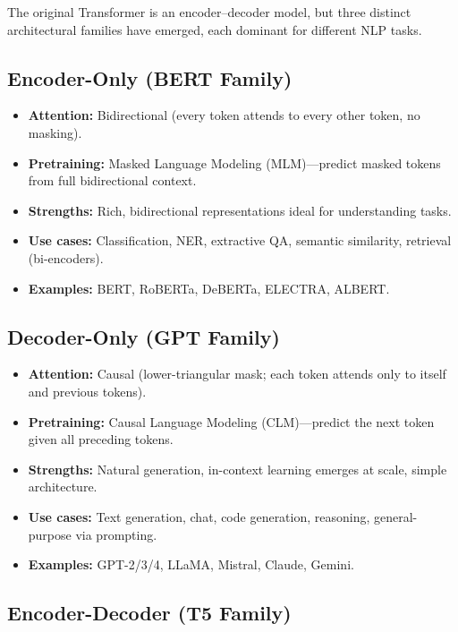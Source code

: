 The original Transformer is an encoder--decoder model, but three distinct
architectural families have emerged, each dominant for different NLP tasks.

\subsection{Encoder-Only (BERT Family)}

\begin{itemize}
    \item \textbf{Attention:} Bidirectional (every token attends to every other
          token, no masking).
    \item \textbf{Pretraining:} Masked Language Modeling (MLM)---predict masked
          tokens from full bidirectional context.
    \item \textbf{Strengths:} Rich, bidirectional representations ideal for
          understanding tasks.
    \item \textbf{Use cases:} Classification, NER, extractive QA, semantic
          similarity, retrieval (bi-encoders).
    \item \textbf{Examples:} BERT, RoBERTa, DeBERTa, ELECTRA, ALBERT.
\end{itemize}

\subsection{Decoder-Only (GPT Family)}

\begin{itemize}
    \item \textbf{Attention:} Causal (lower-triangular mask; each token attends
          only to itself and previous tokens).
    \item \textbf{Pretraining:} Causal Language Modeling (CLM)---predict the
          next token given all preceding tokens.
    \item \textbf{Strengths:} Natural generation, in-context learning emerges
          at scale, simple architecture.
    \item \textbf{Use cases:} Text generation, chat, code generation, reasoning,
          general-purpose via prompting.
    \item \textbf{Examples:} GPT-2/3/4, LLaMA, Mistral, Claude, Gemini.
\end{itemize}

\subsection{Encoder-Decoder (T5 Family)}

